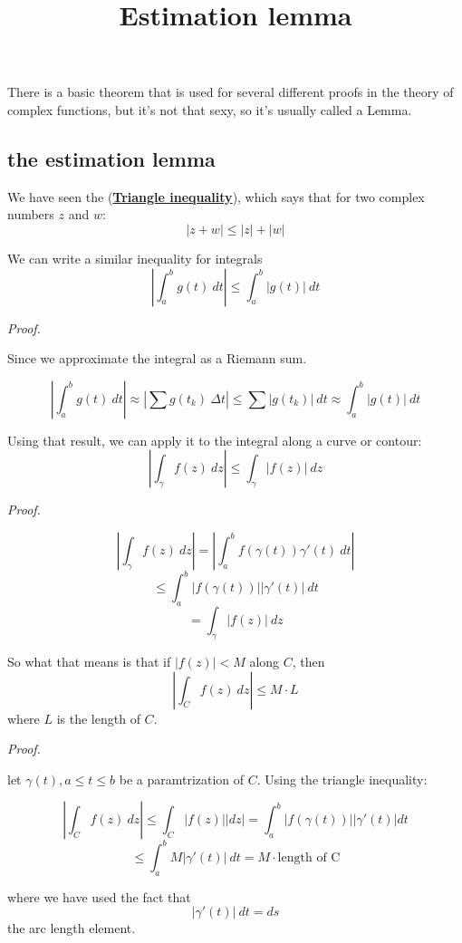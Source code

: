 \documentclass[11pt, oneside]{article}
\title{Estimation lemma}
\date{}
\begin{document}
\maketitle
\Large


There is a basic theorem that is used for several different proofs in the theory of complex functions, but it's not that sexy, so it's usually called a Lemma.

\subsection*{the estimation lemma}

We have seen the (\hyperref[sec:tri_inequality]{\textbf{Triangle inequality}}), which says that for two complex numbers $z$ and $w$:
\[  |z + w| \le |z| + |w| \]

We can write a similar inequality for integrals
\[ | \int_a^b g(t) \ dt | \le \int_a^b | g(t) | \ dt \]

\emph{Proof.}

Since we approximate the integral as a Riemann sum.

\[ |\int_a^b g(t) \ dt| \approx | \sum g(t_k) \ \Delta t | \le \sum | g(t_k) | \ dt \approx \int_a^b |g(t)| \ dt \]

Using that result, we can apply it to the integral along a curve or contour:
\[ | \int_\gamma f(z) \ dz |  \le \int_{\gamma} | f(z) | \ dz \]

\emph{Proof.}

\[ | \int_{\gamma} f(z) \ dz | = | \int_a^b f(\gamma(t)) \gamma'(t) \ dt | \]
\[ \le \int_a^b | f(\gamma(t)) | | \gamma'(t) | \ dt \]
\[ = \int_{\gamma} | f(z) | \ dz \]

So what that means is that if $|f(z)| < M$ along $C$, then
\[ | \int_C f(z) \ dz | \le M \cdot L \]
where $L$ is the length of $C$.

\emph{Proof.}

let $\gamma(t), a \le t \le b$ be a paramtrization of $C$.  Using the triangle inequality:

\[ | \int_C f(z) \ dz | \le \int_C |f(z)| | dz | = \int_a^b |f(\gamma(t))| |\gamma'(t)| dt \]
\[ \le \int_a^b M |\gamma'(t)| \ dt = M \cdot \text{length of C} \]

where we have used the fact that
\[ |\gamma'(t) | \ dt = ds \]
the arc length element.
\end{document}
